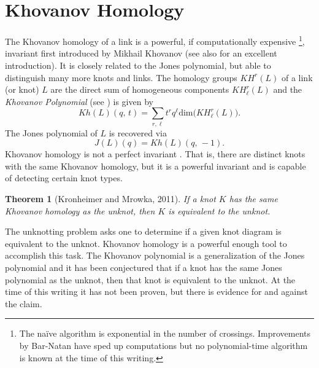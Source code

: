 \documentclass{article}
\theoremstyle{plain}
\newtheorem{theorem}{Theorem}
\begin{document}
    \section{Khovanov Homology}
        The Khovanov homology of a link is a powerful, if computationally
        expensive%
        \footnote{%
            The na\"{i}ve algorithm is exponential in the number of
            crossings. Improvements by Bar-Natan \cite{BarNatan2006FASTKH}
            have sped up computations but no polynomial-time algorithm is
            known at the time of this writing.
        },
        invariant first introduced by Mikhail Khovanov
        \cite{Khovanov1999CatJonesPoly} (see also \cite{BarNatanKhovanovJones}
        for an excellent introduction). It is closely related to the Jones
        polynomial, but able to distinguish many more knots and links. The
        homology groups $KH^{r}(L)$ of a link (or knot) $L$ are the direct sum
        of homogeneous components $KH_{\ell}^{r}(L)$ and the
        \textit{Khovanov Polynomial} (see \cite{KatlasKhoHo}) is given by
        \begin{equation}
            Kh(L)(q,\,t)
            =
            \sum_{r,\ell}t^{r}q^{\ell}\textrm{dim}\big(KH_{\ell}^{r}(L)\big).
        \end{equation}
        The Jones polynomial of $L$ is recovered via
        \begin{equation}
            J(L)(q)
            =
            Kh(L)(q,\,-1).
        \end{equation}
        Khovanov homology is not a perfect invariant
        \cite{Watson2007KnotsWI}. That is, there are
        distinct knots with the same Khovanov homology, but it is a powerful
        invariant and is capable of detecting certain knot types.
        \begin{theorem}[Kronheimer and Mrowka, 2011]
            If a knot $K$ has the same Khovanov homology as the unknot, then $K$
            is equivalent to the unknot.
        \end{theorem}
        The unknotting problem asks one to determine if a given knot diagram is
        equivalent to the unknot. Khovanov homology is a powerful enough tool
        to accomplish this task. The Khovanov polynomial is a generalization of
        the Jones polynomial and it has been conjectured that if a
        knot has the same Jones polynomial as the unknot, then that knot is
        equivalent to the unknot. At the time of this writing it has not been
        proven, but there is evidence for and against the claim.
\end{document}
